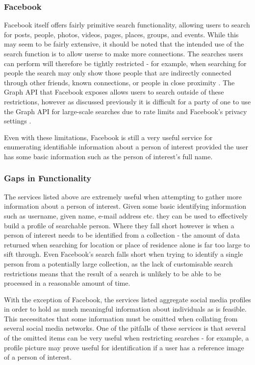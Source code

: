 \documentclass[12pt]{article}
\begin{document}
\subsubsection{Facebook}
Facebook itself offers fairly primitive search functionality, allowing users to search for posts, people, photos, videos, pages, places, groups, and events. While this may seem to be fairly extensive, it should be noted that the intended use of the search function is to allow userse to make more connections. The searches users can perform will therefore be tightly restricted - for example, when searching for people the search may only show those people that are indirectly connected through other friends, known connections, or people in close proximity \citep{facebookpeoplesearch}. The Graph API that Facebook exposes allows users to search outside of these restrictions, however as discussed previously it is difficult for a party of one to use the Graph API for large-scale searches due to rate limits and Facebook's privacy settings \citep{facebookgraphapi}. 

Even with these limitations, Facebook is still a very useful service for enumerating identifiable information about a person of interest provided the user has some basic information such as the person of interest's full name.

\subsubsection{Gaps in Functionality}
The services listed above are extremely useful when attempting to gather more information about a person of interest. Given some basic identifying information such as username, given name, e-mail address etc. they can be used to effectively build a profile of searchable person. Where they fall short however is when a person of interest needs to be identified from a collection - the amount of data returned when searching for location or place of residence alone is far too large to sift through. Even Facebook's search falls short when trying to identify a single person from a potentially large collection, as the lack of customisable search restrictions means that the result of a search is unlikely to be able to be processed in a reasonable amount of time.

With the exception of Facebook, the services listed aggregate social media profiles in order to hold as much meaningful information about individuals as is feasible. This necessitates that some information must be omitted when collating from several social media networks. One of the pitfalls of these services is that several of the omitted items can be very useful when restricting searches - for example, a profile picture may prove useful for identification if a user has a reference image of a person of interest.
\end{document}

